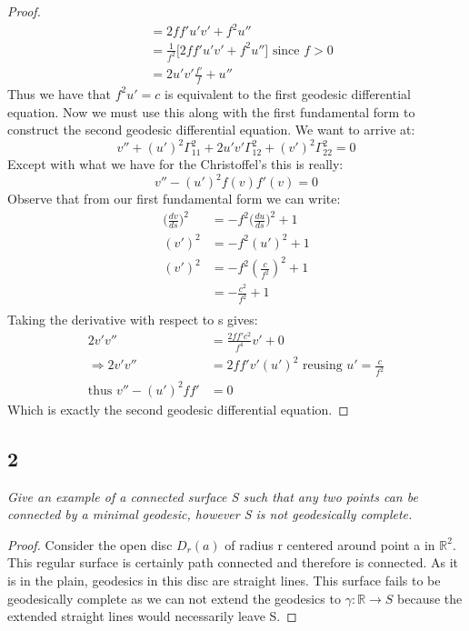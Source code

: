 \documentclass[a4paper, 11pt]{article}
\begin{document}
\begin{enumerate}[label=\alph*]
\begin{proof}
\begin{align*}
						&= 2ff'u'v' + f^2u'' \\ 
						&= \frac{1}{f^2}\Big[2ff'u'v' + f^2u''\Big] \text{ since }f>0\\ 
						&= 2u'v'\frac{f'}{f} + u'' 
				\end{align*}
			Thus we have that $f^2u'=c$ is equivalent to the first geodesic differential equation. Now we must use this along with the first fundamental form to construct the second geodesic differential equation. We want to arrive at: 
				\begin{equation*}
					v'' + (u')^2\Gamma_{11}^2+2u'v'\Gamma_{12}^2+(v')^2\Gamma_{22}^2 = 0
				\end{equation*}
			Except with what we have for the Christoffel's this is really: 
				\begin{equation*}
					v'' - (u')^2f(v)f'(v) = 0
				\end{equation*} 
			Observe that from our first fundamental form we can write:
				\begin{align*}
					\Big(\frac{dv}{ds}\Big)^2 &= -f^2\Big(\frac{du}{ds}\Big)^2 + 1 \\
					(v')^2 &= -f^2(u')^2+1 \\ 
					(v')^2 &= -f^2(\frac{c}{f^2})^2+ 1 \\ 
							&= -\frac{c^2}{f^2} + 1 \\ 
				\end{align*}
			Taking the derivative with respect to s gives: 
				\begin{align*}
					2v'v'' &= \frac{2ff'c^2}{f^4}v' + 0 \\ 
					\Rightarrow 2v'v'' &= 2ff'v'(u')^2  \text{ reusing } u'=\frac{c}{f^2}\\ 
					\text{thus } v''-(u')^2ff' &= 0
				\end{align*}
			Which is exactly the second geodesic differential equation. 
		\end{proof}
	\end{enumerate}
	
	
	
	
\subsection*{2} 
	\textit{Give an example of a connected surface S such that any two points can be connected by a minimal geodesic, however S is not geodesically complete.}
	
	\begin{proof}
		Consider the open disc $D_r(a)$ of radius r centered around point a in $\mathbb{R}^2$. This regular surface is certainly path connected and therefore is connected. As it is in the plain, geodesics in this disc are straight lines. This surface fails to be geodesically complete as we can not extend the geodesics to $\gamma:\mathbb{R}\to S$ because the extended straight lines would necessarily leave S. 
	\end{proof}
	
\end{document}

